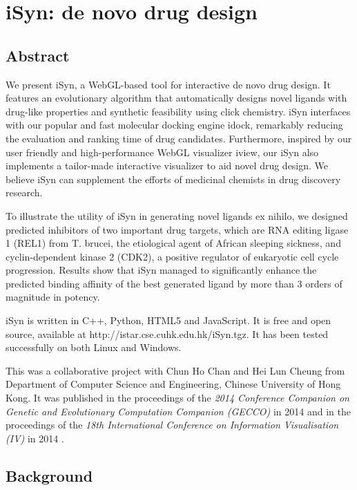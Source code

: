 \chapter{iSyn: de novo drug design}

\section{Abstract}

We present iSyn, a WebGL-based tool for interactive de novo drug design. It features an evolutionary algorithm that automatically designs novel ligands with drug-like properties and synthetic feasibility using click chemistry. iSyn interfaces with our popular and fast molecular docking engine idock, remarkably reducing the evaluation and ranking time of drug candidates. Furthermore, inspired by our user friendly and high-performance WebGL visualizer iview, our iSyn also implements a tailor-made interactive visualizer to aid novel drug design. We believe iSyn can supplement the efforts of medicinal chemists in drug discovery research.

To illustrate the utility of iSyn in generating novel ligands ex nihilo, we designed predicted inhibitors of two important drug targets, which are RNA editing ligase 1 (REL1) from T. brucei, the etiological agent of African sleeping sickness, and cyclin-dependent kinase 2 (CDK2), a positive regulator of eukaryotic cell cycle progression. Results show that iSyn managed to significantly enhance the predicted binding affinity of the best generated ligand by more than 3 orders of magnitude in potency.

iSyn is written in C++, Python, HTML5 and JavaScript. It is free and open source, available at http://istar.cse.cuhk.edu.hk/iSyn.tgz. It has been tested successfully on both Linux and Windows.

This was a collaborative project with Chun Ho Chan and Hei Lun Cheung from Department of Computer Science and Engineering, Chinese University of Hong Kong. It was published in the proceedings of the \textit{2014 Conference Companion on Genetic and Evolutionary Computation Companion (GECCO)} in 2014 \citep{1409} and in the proceedings of the \textit{18th International Conference on Information Visualisation (IV)} in 2014 \citep{1387}.

\section{Background}

